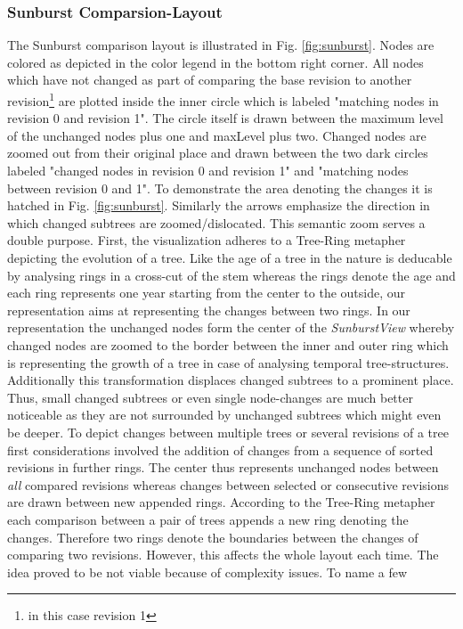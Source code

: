 \subsubsection{Sunburst Comparsion-Layout}
The Sunburst comparison layout is illustrated in Fig. \ref{fig:sunburst}. Nodes are colored as depicted in the color legend in the bottom right corner. All nodes which have not changed as part of comparing the base revision to another revision\footnote{in this case revision 1} are plotted inside the inner circle which is labeled "matching nodes in revision 0 and revision 1". The circle itself is drawn between the maximum level of the unchanged nodes plus one and maxLevel plus two. Changed nodes are zoomed out from their original place and drawn between the two dark circles labeled "changed nodes in revision 0 and revision 1" and "matching nodes between revision 0 and 1". To demonstrate the area denoting the changes it is hatched in Fig. \ref{fig:sunburst}. Similarly the arrows emphasize the direction in which changed subtrees are zoomed/dislocated. This semantic zoom serves a double purpose. First, the visualization adheres to a Tree-Ring metapher depicting the evolution of a tree. Like the age of a tree in the nature is deducable by analysing rings in a cross-cut of the stem whereas the rings denote the age and each ring represents one year starting from the center to the outside, our representation aims at representing the changes between two rings. In our representation the unchanged nodes form the center of the \emph{SunburstView} whereby changed nodes are zoomed to the border between the inner and outer ring which is representing the growth of a tree in case of analysing temporal tree-structures. Additionally this transformation displaces changed subtrees to a prominent place. Thus, small changed subtrees or even single node-changes are much better noticeable as they are not surrounded by unchanged subtrees which might even be deeper. To depict changes between multiple trees or several revisions of a tree first considerations involved the addition of changes from a sequence of sorted revisions in further rings. The center thus represents unchanged nodes between \emph{all} compared revisions whereas changes between selected or consecutive revisions are drawn between new appended rings. According to the Tree-Ring metapher each comparison between a pair of trees appends a new ring denoting the changes. Therefore two rings denote the boundaries between the changes of comparing two revisions. However, this affects the whole layout each time. The idea proved to be not viable because of complexity issues. To name a few


